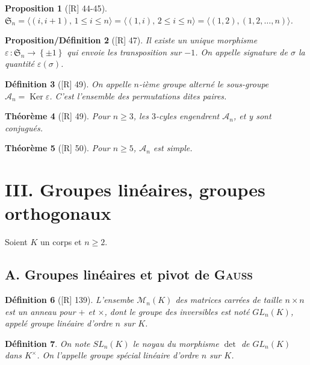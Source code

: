 \documentclass[10pt, a4paper, parskip=full, twoside, twocolumn]{report}
\newtheorem{definition}{Définition}
\newtheorem{theorem}[definition]{Théorème}
\newtheorem{proposition}[definition]{Proposition}
\newtheorem{proposition_def}[definition]{Proposition/Définition}
\newcommand{\M}{\mathcal{M}}
\newcommand{\A}{\mathcal{A}}
\DeclareMathOperator{\Ker}{Ker}
\begin{document}
\begin{proposition}[\textnormal{[R] 44-45}]
	$\mathfrak{S}_n = \langle (i,i+1),\, 1\leq i\leq n\rangle = \langle (1,i),\,2\leq i\leq n\rangle = \langle (1,2), (1,2,\dots,n)\rangle$.
\end{proposition}

\begin{proposition_def}[\textnormal{[R] 47}]
	Il existe un unique morphisme $\varepsilon\,\colon \mathfrak{S}_n\to\left\{\pm 1\right\}$ qui envoie les transposition sur $-1$.
	On appelle \emph{signature de $\sigma$} la quantité $\varepsilon(\sigma)$.
\end{proposition_def}

\begin{definition}[\textnormal{[R] 49}]
	On appelle \emph{$n$-ième groupe alterné} le sous-groupe $\A_n =\Ker \varepsilon$. C'est l'ensemble des permutations dites \emph{paires}.
\end{definition}

\begin{theorem}[\textnormal{[R] 49}]
	Pour $n\geq 3$, les $3$-cyles engendrent $\A_n$, et y sont conjugués.
\end{theorem}

\begin{theorem}[\textnormal{[R] 50}]
	Pour $n\geq 5$, $\A_n$ est simple.
\end{theorem}

\section*{III. Groupes linéaires, groupes orthogonaux}
\textcolor{paragraphtext}{Soient $K$ un corps et $n\geq 2$.}

\subsection*{A. Groupes linéaires et pivot de \textsc{Gauss}}

\begin{definition}[\textnormal{[R] 139}]
	L'ensembe $\M_n(K)$ des matrices carrées de taille $n\times n$ est un anneau pour $+$ et $\times$, dont le groupe des inversibles est noté $GL_n(K)$, appelé \emph{groupe linéaire d'ordre $n$ sur $K$}.
\end{definition}

\begin{definition}
	On note $SL_n(K)$ le noyau du morphisme $\det$ de $GL_n(K)$ dans $K^{\times}$.
	On l'appelle \emph{groupe spécial linéaire d'ordre $n$ sur $K$}.
\end{definition}
\end{document}
